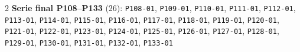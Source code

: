 \begin{multicols}{2}
\noindent\textbf{Serie final P108--P133} (26): \texttt{P108-\allowbreak{}01}, \texttt{P109-\allowbreak{}01}, \texttt{P110-\allowbreak{}01}, \texttt{P111-\allowbreak{}01}, \texttt{P112-\allowbreak{}01}, \texttt{P113-\allowbreak{}01}, \texttt{P114-\allowbreak{}01}, \texttt{P115-\allowbreak{}01}, \texttt{P116-\allowbreak{}01}, \texttt{P117-\allowbreak{}01}, \texttt{P118-\allowbreak{}01}, \texttt{P119-\allowbreak{}01}, \texttt{P120-\allowbreak{}01}, \texttt{P121-\allowbreak{}01}, \texttt{P122-\allowbreak{}01}, \texttt{P123-\allowbreak{}01}, \texttt{P124-\allowbreak{}01}, \texttt{P125-\allowbreak{}01}, \texttt{P126-\allowbreak{}01}, \texttt{P127-\allowbreak{}01}, \texttt{P128-\allowbreak{}01}, \texttt{P129-\allowbreak{}01}, \texttt{P130-\allowbreak{}01}, \texttt{P131-\allowbreak{}01}, \texttt{P132-\allowbreak{}01}, \texttt{P133-\allowbreak{}01}\par\smallskip

\end{multicols}
